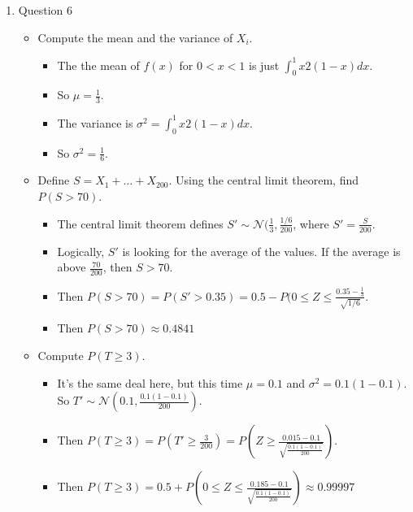 \documentclass{article}
\begin{document}
\begin{enumerate}
\item Question 6
    \begin{itemize}
    \item Compute the mean and the variance of $X_i$.
        \begin{itemize}
        \item The the mean of $f(x)$ for $0 < x < 1$ is just $\int_0^1 x2(1 - x)dx$.
        \item So $\mu = \frac{1}{3}$.
        \item The variance is $\sigma^2 = \int_0^1 x2(1 - x)dx$.
        \item So $\sigma^2 = \frac{1}{6}$.
        \end{itemize}
    \item Define $S=X_1+\ldots+X_{200}$. Using the central limit theorem, find $P(S>70)$.
        \begin{itemize}
        \item The central limit theorem defines $S' \sim \mathcal{N}(\frac{1}{3}, \frac{1/6}{200}$, where $S' = \frac{S}{200}$.
        \item Logically, $S'$ is looking for the average of the values. If the average is above $\frac{70}{200}$, then $S > 70$.
        \item Then $P(S > 70) = P(S' > 0.35) = 0.5 - P(0 \leq Z \leq \frac{0.35 - \frac{1}{3}}{\sqrt{1/6}}$.
        \item Then $P(S > 70) \approx 0.4841$
        \end{itemize}
    \item Compute $P(T\ge3)$.
        \begin{itemize}
        \item It's the same deal here, but this time $\mu = 0.1$ and $\sigma^2 = 0.1(1 - 0.1)$. So $T' \sim \mathcal{N}(0.1, \frac{0.1(1 - 0.1)}{200})$.
        \item Then $P(T \geq 3) = P(T' \geq \frac{3}{200}) = P(Z \geq \frac{0.015 - 0.1}{\sqrt{\frac{0.1(1 - 0.1)}{200}}})$.
        \item Then $P(T \geq 3) = 0.5 + P(0 \leq Z \leq \frac{0.185 - 0.1}{\sqrt{\frac{0.1(1 - 0.1)}{200}}}) \approx 0.99997$
        \end{itemize}
    \end{itemize}


\end{enumerate}
\end{document}
